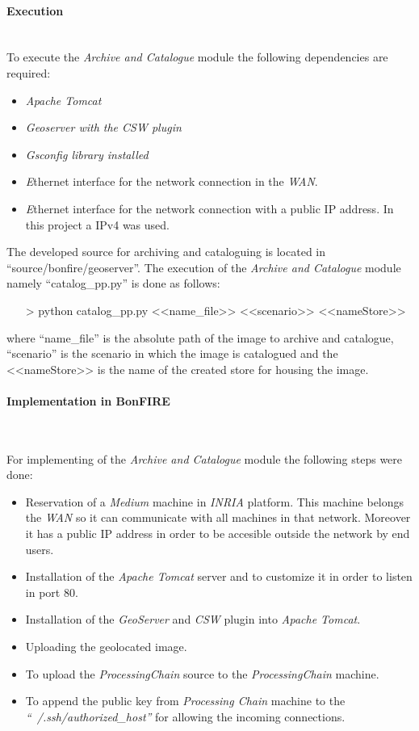 \paragraph{Execution}~\\

To execute the \emph{Archive and Catalogue} module the following dependencies
are required:
\begin{itemize}
\item \emph{Apache Tomcat}
\item \emph{Geoserver with the \ac{CSW} plugin}
\item \emph{Gsconfig library installed}
\item \emph Ethernet interface for the network connection in the \bonfire
  \emph{WAN}.
\item \emph Ethernet interface for the network connection with a public \ac{IP}
  address. In this project a \ac{IP}v4 was used.
\end{itemize}

The developed source for archiving and cataloguing is located in
``source/bonfire/geoserver''. The execution of the \emph{Archive and Catalogue}
module namely ``catalog\_pp.py'' is done as follows:
\begin{itemize}
\item[>] python catalog\_pp.py <<name\_file>> <<scenario>> <<nameStore>>
\end{itemize}
where ``name\_file'' is the absolute path of the image to archive and catalogue,
``scenario'' is the scenario in which the image is catalogued and the
<<nameStore>> is the name of the created store for housing the image.

\paragraph{Implementation in BonFIRE}~\\
\label{para:bonfire-impl-cat}


For implementing of the \emph{Archive and Catalogue} module the following steps were done:

\begin{itemize}
 \item Reservation of a \emph{Medium} machine in \emph{INRIA} \bonfire
   platform. This machine belongs the \bonfire \emph{WAN} so it can communicate
   with all machines in that network. Moreover it has a public \ac{IP} address
   in order to be accesible outside the \bonfire network by end users. 
 \item Installation of the \emph{Apache Tomcat} server and to customize it in
   order to listen in port 80.
 \item Installation of the \emph{GeoServer} and \emph{CSW} plugin into
   \emph{Apache Tomcat}.
 \item Uploading the geolocated image.
 \item To upload the \emph{ProcessingChain} source to the \emph{ProcessingChain}
   machine.
 \item To append the public key from \emph{Processing Chain} machine to the
   \emph{``~/.ssh/authorized\_host''} for
   allowing the incoming connections.
\end{itemize}


